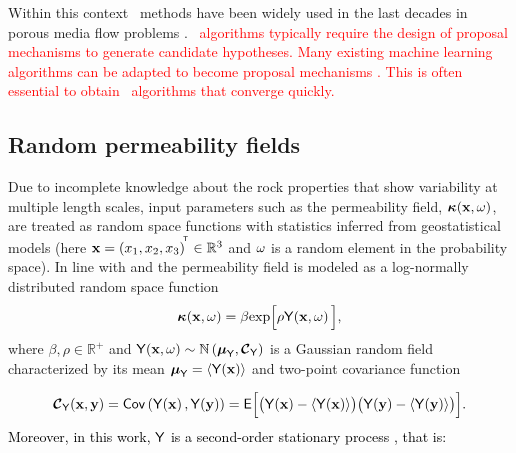 Within this context \mcmc\ methods have been
widely used in the last decades in porous media flow problems
\citep{liu2003,efendiev05,efendiev2006,ma2008,dostert10,das10,mondal10,ginting11,ginting12,iglesias13,emerick2013}.
\textcolor{red}{
\mcmc\ algorithms typically require the design of proposal mechanisms to generate candidate hypotheses.
Many existing machine learning algorithms can be adapted to become proposal mechanisms \citep{n2013variational}.
This is often essential to obtain \mcmc\ algorithms that converge quickly.}


\subsection{Random permeability fields}\label{fieldgeneratio}

Due to incomplete knowledge about the rock properties that show variability at multiple length scales, input parameters such as the permeability field, $\boldsymbol{\kappa}(\mathbf{x},\omega)$, are treated as random space functions with statistics inferred from geostatistical models (here $\mathbf{x} =\left( x_{1},x_{2},x_{3}  \right)^{\! ^{\mathsf{T}}}\in \mathbb{R}^{3}$ and $\omega$ is a random element in the probability space).
In line with \cite{dagan89} and \cite{gelhar93} the permeability field is modeled as a log-normally distributed random space function
%
\begin{equation}
  \boldsymbol{\kappa}\!\left(\mathbf{x},\omega\right) = \beta\mbox{exp}\Big[\rho\mathsf{Y}\!\left(\mathbf{x},\omega\right)\Big],
\label{field}
\end{equation}
%
\noindent where $\beta,\rho\in\mathbb{R}^{+}$ and $\mathsf{Y}\!\left(\mathbf{x},\omega\right) \sim \mathbb{N}\left({\boldsymbol{\mu}_{\mathsf{Y}}},{\boldmath{\mbox{$\mathcal{C}$}}}_{\mathsf{Y}}\right)$ is a Gaussian random field
characterized by its mean ${\boldsymbol{\mu}_{\mathsf{Y}}} = \langle {\mathsf{Y}\!\left(\mathbf{x}\right)} \rangle$ and two-point covariance function

\begin{equation}
 {\boldmath{\mbox{$\mathcal{C}$}}}_{\mathsf{Y}}(\mathbf{x}, \mathbf{y}) = \mathsf{Cov}\left( \mathsf{Y}\!\left(\mathbf{x}\right), \mathsf{Y}\!\left(\mathbf{y}\right) \right) = \mathsf{E}\Big[ \big( \mathsf{Y}\!\left(\mathbf{x}\right) - \langle {\mathsf{Y}\!\left(\mathbf{x}\right)} \rangle  \big) \big( \mathsf{Y}\!\left(\mathbf{y}\right) - \langle {\mathsf{Y}\!\left(\mathbf{y}\right)} \rangle  \big) \Big].
 \label{covg}
\end{equation}
%
\textcolor{black}{Moreover, in this work, $\mathsf{Y}$ is a second-order stationary process \citep{gelhar93}, that is:}

